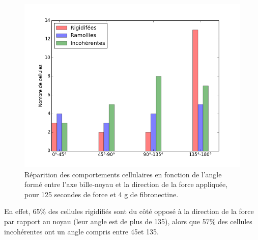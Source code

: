 \begin{figure}
\includegraphics[scale=0.5]{Figures/Hist_Angles.png} 
\caption{Réparition des comportements cellulaires en fonction de l'angle formé entre l'axe bille-noyau et la direction de la force appliquée, pour 125 secondes de force et 4 \micro g de fibronectine. \label{Angle_C4}}
\end{figure}

En effet, 65\% des cellules rigidifiés sont du côté opposé à la direction de la force par rapport au noyau (leur angle est de plus de 135\degres ), alors que 57\% des cellules incohérentes ont un angle compris entre 45\degres et 135\degres . 
%